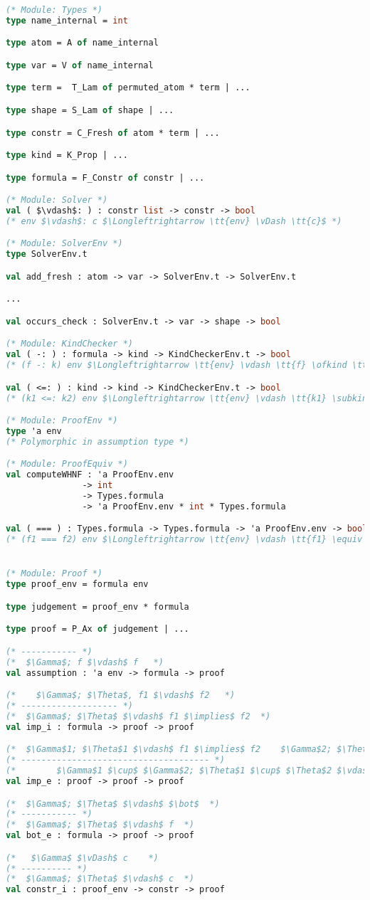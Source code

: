 \documentclass[english, mgr]{iithesis}
\renewcommand{\tt}[1]{\texttt{\small{#1}}}
\begin{document}
\begin{lstlisting}[mathescape, language=OCaml]
(* Module: Types *)
type name_internal = int

type atom = A of name_internal

type var = V of name_internal

type term =  T_Lam of permuted_atom * term | ...

type shape = S_Lam of shape | ...

type constr = C_Fresh of atom * term | ...

type kind = K_Prop | ...

type formula = F_Constr of constr | ...

(* Module: Solver *)
val ( $\vdash$: ) : constr list -> constr -> bool
(* env $\vdash$: c $\Longleftrightarrow \tt{env} \vDash \tt{c}$ *)

(* Module: SolverEnv *)
type SolverEnv.t

val add_fresh : atom -> var -> SolverEnv.t -> SolverEnv.t

...

val occurs_check : SolverEnv.t -> var -> shape -> bool

(* Module: KindChecker *)
val ( -: ) : formula -> kind -> KindCheckerEnv.t -> bool
(* (f -: k) env $\Longleftrightarrow \tt{env} \vdash \tt{f} \ofkind \tt{k}$ *)

val ( <=: ) : kind -> kind -> KindCheckerEnv.t -> bool
(* (k1 <=: k2) env $\Longleftrightarrow \tt{env} \vdash \tt{k1} \subkind \tt{k2}$ *)

(* Module: ProofEnv *)
type 'a env
(* Polymorphic in assumption type *)

(* Module: ProofEquiv *)
val computeWHNF : 'a ProofEnv.env
               -> int
               -> Types.formula
               -> 'a ProofEnv.env * int * Types.formula

val ( === ) : Types.formula -> Types.formula -> 'a ProofEnv.env -> bool
(* (f1 === f2) env $\Longleftrightarrow \tt{env} \vdash \tt{f1} \equiv \tt{f2}$ *)


(* Module: Proof *)
type proof_env = formula env

type judgement = proof_env * formula

type proof = P_Ax of judgement | ...

(* ----------- *)
(*  $\Gamma$; f $\vdash$ f   *)
val assumption : 'a env -> formula -> proof

(*    $\Gamma$; $\Theta$, f1 $\vdash$ f2   *)
(* ------------------- *)
(*  $\Gamma$; $\Theta$ $\vdash$ f1 $\implies$ f2  *)
val imp_i : formula -> proof -> proof

(*  $\Gamma$1; $\Theta$1 $\vdash$ f1 $\implies$ f2    $\Gamma$2; $\Theta$2 $\vdash$ f2  *)
(* ------------------------------------- *)
(*        $\Gamma$1 $\cup$ $\Gamma$2; $\Theta$1 $\cup$ $\Theta$2 $\vdash$ f2         *)
val imp_e : proof -> proof -> proof

(*  $\Gamma$; $\Theta$ $\vdash$ $\bot$  *)
(* ----------- *)
(*  $\Gamma$; $\Theta$ $\vdash$ f  *)
val bot_e : formula -> proof -> proof

(*   $\Gamma$ $\vDash$ c    *)
(* ---------- *)
(*  $\Gamma$; $\Theta$ $\vdash$ c  *)
val constr_i : proof_env -> constr -> proof
\end{lstlisting}
\end{document}
